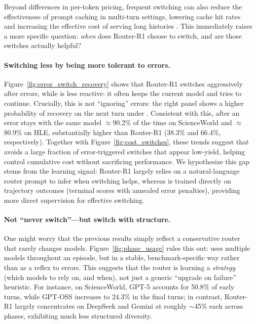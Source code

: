 Beyond differences in per-token pricing, frequent switching can also reduce the effectiveness of prompt caching in multi-turn settings, lowering cache hit rates and increasing the effective cost of serving long histories \citep{hu2025hands}.
This immediately raises a more specific question: \emph{when} does Router-R1 choose to switch, and are those switches actually helpful?







\paragraph{Switching less by being more tolerant to errors.}
Figure~\ref{fig:error_switch_recovery} shows that Router-R1 switches aggressively after errors, while \method is less reactive: it often keeps the current model and tries to continue.
Crucially, this is not ``ignoring'' errors: the right panel shows a higher probability of recovery on the next turn under \method.
Consistent with this, after an error \method stays with the same model $\approx$90.2\% of the time on ScienceWorld and $\approx$80.9\% on HLE, substantially higher than Router-R1 (38.3\% and 66.4\%, respectively).
Together with Figure~\ref{fig:cost_switches}, these trends suggest that \method avoids a large fraction of error-triggered switches that appear low-yield, helping control cumulative cost without sacrificing performance.
We hypothesize this gap stems from the learning signal: Router-R1 largely relies on a natural-language router prompt to infer when switching helps, whereas \method is trained directly on trajectory outcomes (terminal scores with annealed error penalties), providing more direct supervision for effective switching.

\paragraph{Not ``never switch''---but switch with structure.}
One might worry that the previous results simply reflect a conservative router that rarely changes models.
Figure~\ref{fig:phase_usage} rules this out: \method uses multiple models throughout an episode, but in a stable, benchmark-specific way rather than as a reflex to errors.
This suggests that the router is learning a \emph{strategy} (which models to rely on, and when), not just a generic ``upgrade on failure'' heuristic.
For instance, on ScienceWorld, GPT-5 accounts for 50.8\% of early turns, while GPT-OSS increases to 24.3\% in the final turns; in contrast, Router-R1 largely concentrates on DeepSeek and Gemini at roughly $\sim$45\% each across phases, exhibiting much less structured diversity.

